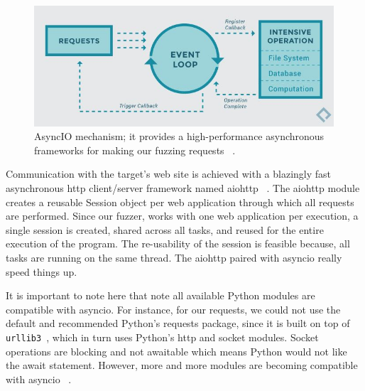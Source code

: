 \begin{figure}[ht]
 \centering
 \captionsetup{justification=centering}
 \includegraphics[width=4.4in]{figures/asyncio_process.jpg}
 \caption{AsyncIO mechanism; it provides a high-performance asynchronous frameworks for making our fuzzing requests ~\cite{asyncio_image_source}.}
 \label{fig:asyncio_image_source}
\end{figure}

Communication with the target's web site is achieved with a blazingly fast asynchronous http client/server framework named aiohttp ~\cite{aiohttp}. The aiohttp module creates a reusable Session object per web application through which all requests are performed. Since our fuzzer, works with one web application per execution, a single session is created, shared across all tasks, and reused for the entire execution of the program. The re-usability of the session is feasible because, all tasks are running on the same thread. The aiohttp paired with asyncio really speed things up.

It is important to note here that note all available Python modules are compatible with asyncio. For instance, for our requests, we could not use the default and recommended Python's requests package, since it is built on top of {\tt urllib3 }, which in turn uses Python's http and socket modules. Socket operations are blocking and not awaitable which means Python would not like the await statement. However, more and more modules are becoming compatible with asyncio ~\cite{aiohttp}.


